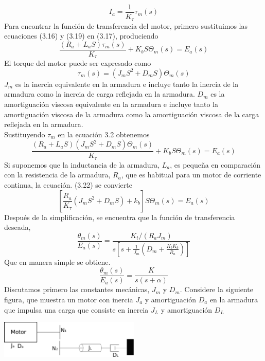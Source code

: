 \begin{equation}
	I_a = \frac{1}{K_\tau} \tau_m (s)
\end{equation}
Para encontrar la función de transferencia del motor, primero sustituimos las ecuaciones (3.16) y (3.19) en (3.17), produciendo
\begin{equation}
	\frac{(R_a + L_aS) \tau_m(s)}{K_\tau} + K_bS \Theta_m(s) = E_a(s)
\end{equation}
El torque del motor puede ser expresado como
\begin{equation}
	\tau_m(s) = (J_mS^2 + D_mS) \Theta_m(s)
\end{equation}
$J_m$ es la inercia equivalente en la armadura e incluye tanto la inercia de la armadura como la inercia de carga reflejada en la armadura. $D_m$ es la amortiguación viscosa
equivalente en la armadura e incluye tanto la amortiguación viscosa de la armadura como la amortiguación viscosa de la carga reflejada en la armadura.\\
Sustituyendo $\tau_m$ en la ecuación 3.2 obtenemos
\begin{equation}
	\frac{(R_a + L_aS) (J_mS^2 + D_mS) \Theta_m(s) }{K_\tau} + K_bS \Theta_m(s) = E_a(s)
\end{equation}
Si suponemos que la inductancia de la armadura, $L_a$, es pequeña en comparación con la resistencia de la armadura, $R_a$, que es habitual para un motor de corriente continua,
la ecuación. (3.22) se convierte
\begin{equation}
	\left[ \frac{R_a }{K_\tau} (J_mS^2 + D_mS) + k_b \right] S\Theta_m(s)  = E_a(s)
\end{equation}
Después de la simplificación, se encuentra que la función de transferencia deseada,
\begin{equation}
	\frac{\theta_m (s)}{E_a(s)} = \frac{K_t / (R_aJ_m)}{s \left[ s + \frac{1}{J_m} \left( D_m + \frac{K_tK_b}{R_a} \right) \right]}
\end{equation}
Que en manera simple se obtiene.
\begin{equation}
	\frac{\theta_m (s)}{E_a(s)} = \frac{K}{s(s+\alpha)}
\end{equation}
Discutamos primero las constantes mecánicas, $J_m$ y $D_m$. Considere la siguiente figura, que muestra un motor con inercia $J_a$
y amortiguación $D_a$ en la armadura que impulsa una carga que consiste en inercia $J_L$ y amortiguación $D_L$
\begin{center}
	\includegraphics[width=0.5\textwidth]{Contenido/Cuerpo/Capitulo3/Fig18.eps}
	\label{fig:ModeloMat:Fig1}
\end{center}
